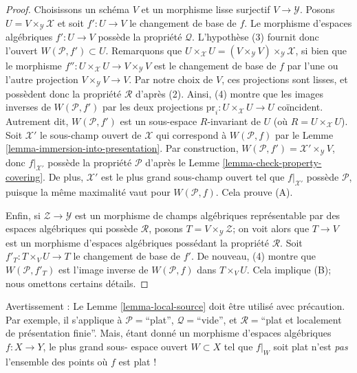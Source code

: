 \begin{proof}
Choisissons un schéma $V$ et un morphisme lisse surjectif $V \to \mathcal{Y}$.
Posons $U = V \times_\mathcal{Y} \mathcal{X}$ et soit $f' : U \to V$ le
changement de base de $f$. Le morphisme d'espaces algébriques $f' : U \to V$ possède
la propriété $\mathcal{Q}$. L'hypothèse (3) fournit donc l'ouvert $W(\mathcal{P}, f') \subset U$.
Remarquons que
$U \times_\mathcal{X} U =
(V \times_\mathcal{Y} V) \times_\mathcal{Y} \mathcal{X}$,
si bien que le morphisme $f'' : U \times_\mathcal{X} U \to V \times_\mathcal{Y} V$
est le changement de base de $f$ par l'une ou l'autre projection
$V \times_\mathcal{Y} V \to V$. Par notre choix de $V$, ces projections
sont lisses, et possèdent donc la propriété $\mathcal{R}$ d'après (2). Ainsi, (4) montre
que les images inverses de $W(\mathcal{P}, f')$ par les deux projections
$\text{pr}_i : U \times_\mathcal{X} U \to U$ coïncident. Autrement dit,
$W(\mathcal{P}, f')$ est un sous-espace $R$-invariant de $U$ (où
$R = U \times_\mathcal{X} U$). Soit $\mathcal{X}'$ le sous-champ ouvert de
$\mathcal{X}$ qui correspond à $W(\mathcal{P}, f)$ par le
Lemme \ref{lemma-immersion-into-presentation}.
Par construction, $W(\mathcal{P}, f') = \mathcal{X}' \times_\mathcal{Y} V$,
donc $f|_{\mathcal{X}'}$ possède la propriété $\mathcal{P}$ d'après le
Lemme \ref{lemma-check-property-covering}.
De plus, $\mathcal{X}'$ est le plus grand sous-champ ouvert
tel que $f|_{\mathcal{X}'}$ possède $\mathcal{P}$, puisque la même maximalité vaut
pour $W(\mathcal{P}, f)$. Cela prouve (A).

\medskip\noindent
Enfin, si $\mathcal{Z} \to \mathcal{Y}$ est un
morphisme de champs algébriques représentable par des espaces algébriques qui possède
$\mathcal{R}$, posons $T = V \times_\mathcal{Y} \mathcal{Z}$; on voit alors que
$T \to V$ est un morphisme d'espaces algébriques possédant
la propriété $\mathcal{R}$. Soit $f'_T : T \times_V U \to T$ le changement de base
de $f'$. De nouveau, (4) montre que $W(\mathcal{P}, f'_T)$
est l'image inverse de $W(\mathcal{P}, f)$ dans $T \times_V U$. Cela implique
(B); nous omettons certains détails.
\end{proof}

\begin{remark}
\label{remark-local-source-warning}
Avertissement :
Le Lemme \ref{lemma-local-source}
doit être utilisé avec précaution. Par exemple, il s'applique à
$\mathcal{P}=$``plat'', $\mathcal{Q}=$``vide'',
et $\mathcal{R}=$``plat et localement de présentation finie''. Mais, étant donné un
morphisme d'espaces algébriques $f : X \to Y$, le plus grand sous-
espace ouvert $W \subset X$ tel que $f|_W$ soit plat n'est {\it pas} l'ensemble des points
où $f$ est plat !
\end{remark}

